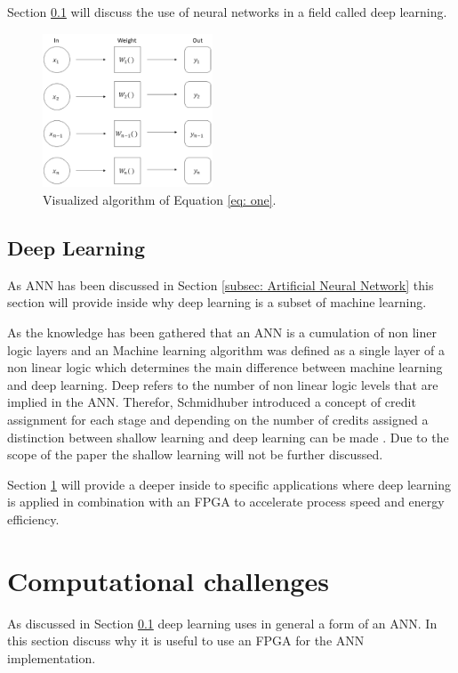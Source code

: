 \documentclass[conference]{IEEEtran}
\begin{document}
Section \ref{subsec: Deep Learning} will discuss the use of neural networks in a field called deep learning.
\begin{figure}[htbp]
	\centerline{\includegraphics[width=0.45\textwidth]{01_images/fig_algo_example.PNG}}
	\caption{Visualized algorithm of Equation \ref{eq: one}.}
	\label{fig: fig_algo_example}
\end{figure}

\subsection{Deep Learning}\label{subsec: Deep Learning}
As ANN has been discussed in Section \ref{subsec: Artificial Neural Network} this section will provide inside why deep learning is a subset of machine learning. 

As the knowledge has been gathered that an ANN is a cumulation of non liner logic layers and an Machine learning algorithm was defined as a single layer of a non linear logic which determines the main difference between machine learning and deep learning. Deep refers to the number of non linear logic levels that are implied in the ANN. Therefor, Schmidhuber introduced a concept of credit assignment for each stage and depending on the number of credits assigned a distinction between shallow learning and deep learning can be made \cite{Schmidhuber}. Due to the scope of the paper the shallow learning will not be further discussed.

Section \ref{sec: Computational challenges} will provide a deeper inside to specific applications where deep learning is applied in combination with an FPGA to accelerate process speed and energy efficiency.

\section{Computational challenges}\label{sec: Computational challenges}
As discussed in Section \ref{subsec: Deep Learning} deep learning uses in general a form of an ANN. In this section discuss why it is useful to use an FPGA for the ANN implementation.
\end{document}
